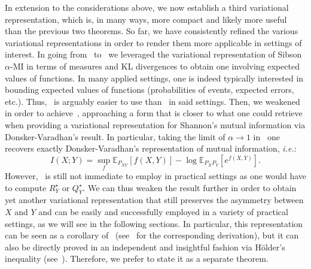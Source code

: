 \documentclass{article}
\numberwithin{theorem}{section}
\numberwithin{example}{section}
\numberwithin{remark}{section}
\numberwithin{definition}{section}
\newcommand{\E}{\mathbb{E}}
\begin{document}
In extension to the considerations above, we now establish a third variational representation, which is, in many ways, more compact and likely more useful than the previous two theorems. So far, we have consistently refined the various variational representations in order to render them more applicable in settings of interest. In going from~ to~ we leveraged the variational representation of Sibson $\alpha$-MI in terms of measures and KL divergences to obtain one involving expected values of functions. In many applied settings, one is indeed typically interested in bounding expected values of functions (probabilities of events, expected errors, etc.). Thus,~ is arguably easier to use than~ in said settings. Then, we weakened~ in order to achieve~, approaching a form that is closer to what one could retrieve when providing a variational representation for Shannon's mutual information via Donsker-Varadhan's result. In particular, taking the limit of $\alpha\to 1$ in~ one recovers exactly Donsker-Varadhan's representation of mutual information, \textit{i.e.}:
\begin{equation}
        I(X;Y) = \sup_{f} \E_{P_{XY}}\left[f(X,Y)\right] - \log \E_{P_XP_Y}\left[e^{f(X,Y)}\right]. \label{eq:varReprMI2}
\end{equation}
However,~ is still not immediate to employ in practical settings as one would have to compute $R_Y^\star$ or $Q_Y^\star$. We can thus weaken the result further in order to obtain yet another variational representation that still preserves the asymmetry between $X$ and $Y$ and can be easily and successfully employed in a variety of practical settings, as we will see in the following sections.
In particular, this representation can be seen as a corollary of~ (see~ for the corresponding derivation), but it can also be directly proved in an independent and insightful fashion via H\"older's inequality (see~). Therefore, we prefer to state it as a separate theorem.
\end{document}
